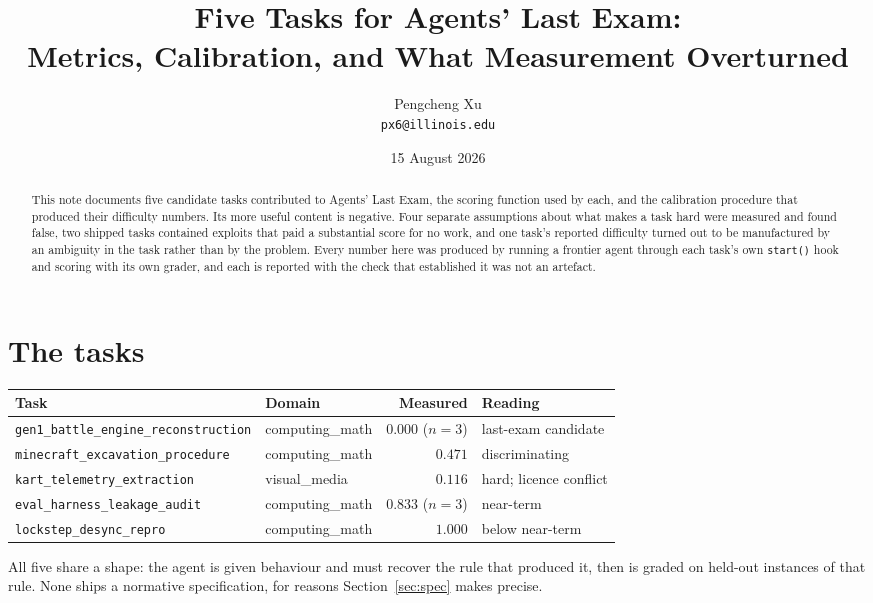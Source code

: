 \documentclass[11pt,a4paper]{article}
\title{Five Tasks for Agents' Last Exam:\\
       Metrics, Calibration, and What Measurement Overturned}
\author{Pengcheng Xu \\ \texttt{px6@illinois.edu}}
\date{15 August 2026}
\newcommand{\task}[1]{\texttt{#1}}
\begin{document}
\maketitle

\begin{abstract}
This note documents five candidate tasks contributed to Agents' Last Exam, the
scoring function used by each, and the calibration procedure that produced their
difficulty numbers. Its more useful content is negative. Four separate assumptions
about what makes a task hard were measured and found false, two shipped tasks
contained exploits that paid a substantial score for no work, and one task's
reported difficulty turned out to be manufactured by an ambiguity in the task rather
than by the problem. Every number here was produced by running a frontier agent
through each task's own \texttt{start()} hook and scoring with its own grader, and
each is reported with the check that established it was not an artefact.
\end{abstract}

\section{The tasks}

\begin{center}
\small
\begin{tabular}{@{}llrl@{}}
\toprule
Task & Domain & Measured & Reading \\
\midrule
\task{gen1\_battle\_engine\_reconstruction} & computing\_math & $0.000$ ($n{=}3$) & last-exam candidate \\
\task{minecraft\_excavation\_procedure}     & computing\_math & $0.471$          & discriminating \\
\task{kart\_telemetry\_extraction}          & visual\_media   & $0.116$          & hard; licence conflict \\
\task{eval\_harness\_leakage\_audit}        & computing\_math & $0.833$ ($n{=}3$) & near-term \\
\task{lockstep\_desync\_repro}              & computing\_math & $1.000$          & below near-term \\
\bottomrule
\end{tabular}
\end{center}

All five share a shape: the agent is given behaviour and must recover the rule that
produced it, then is graded on held-out instances of that rule. None ships a
normative specification, for reasons Section~\ref{sec:spec} makes precise.
\end{document}
